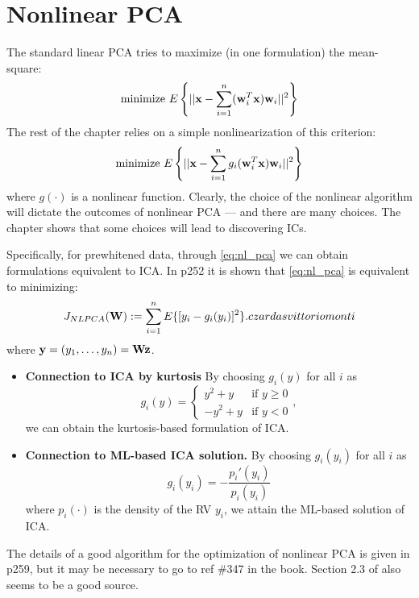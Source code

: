 \documentclass[a4paper, one	side]{book}
\begin{document}
\section{Nonlinear PCA}
The standard linear PCA tries to maximize (in one formulation) the mean-square:
\begin{equation}
\text{minimize}\,\, E\left\{ ||\mathbf x - \sum\limits_{i=1}^n (\mathbf w_i^T \mathbf x) \mathbf w_i||^2 \right\}
\end{equation}
The rest of the chapter relies on a simple nonlinearization of this criterion:
\begin{equation}
\text{minimize}\,\, E\left\{ ||\mathbf x - \sum\limits_{i=1}^n g_i(\mathbf w_i^T \mathbf x) \mathbf w_i||^2 \right\}
\label{eq:nl_pca}
\end{equation}
where $g(\cdot)$ is a nonlinear function. Clearly, the choice of the nonlinear algorithm will dictate the outcomes of nonlinear PCA \---- and there are many choices. The chapter shows that some choices will lead to discovering ICs.

Specifically, for prewhitened data, through \eqref{eq:nl_pca} we can obtain formulations equivalent to ICA. In p252 it is shown that \eqref{eq:nl_pca} is equivalent to minimizing:  
\begin{equation}
J_{NLPCA}(\mathbf W) := \sum_{i=1}^n E\{[y_i-g_i(y_i)]^2\}.
\label{eq:J_nlpca}czardas vittorio monti
\end{equation}
where $\mathbf y = (y_1,\hdots,y_n) = \mathbf{Wz}$.

\begin{itemize}
\item \textbf{Connection to ICA by kurtosis} By choosing $g_i(y)$ for all $i$ as 
$$g_i(y) = \begin{cases} y^2 + y & \text{if}\,\, y \ge 0 \\ -y^2 + y & \text{if}\,\, y<0 \end{cases},$$
we can obtain the kurtosis-based formulation of ICA.
\item \textbf{Connection to ML-based ICA solution.} By choosing $g_i(y_i)$ for all $i$ as %
$$g_i(y_i) = -\frac{p_i'(y_i)}{p_i(y_i)}$$
where $p_i(\cdot)$ is the density of the RV $y_i$, we attain the ML-based solution of ICA. \end{itemize}
The details of a good algorithm for the optimization of nonlinear PCA is given in p259, but it may be necessary to go to ref \#347 in the book. Section 2.3 of \cite{landqvist05} also seems to be a good source.
\end{document}

